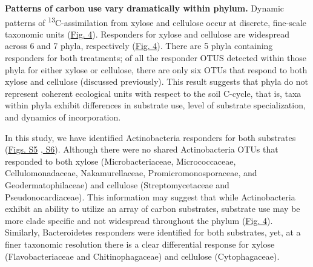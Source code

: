 \textbf{Patterns of carbon use vary dramatically within phylum.} Dynamic
patterns of \textsuperscript{13}C-assimilation from xylose and cellulose occur
at discrete, fine-scale taxonomic units
(\href{https://authorea.com/users/3537/articles/3612/master/file/figures/bacteria_tree/bacteria_tree.png}{Fig.
4}). Responders for xylose and cellulose are widespread across 6 and 7 phyla,
respectively
(\href{https://authorea.com/users/3537/articles/3612/master/file/figures/bacteria_tree/bacteria_tree.png}{Fig.
4}). There are 5 phyla containing responders for both treatments; of all the
responder OTUS detected within those phyla for either xylose or cellulose,
there are only six OTUs that respond to both xylose and cellulose (discussed
previously). This result suggests that phyla do not represent coherent
ecological units with respect to the soil C-cycle, that is, taxa within phyla
exhibit differences in substrate use, level of substrate specialization, and
dynamics of incorporation. 

In this study, we have identified Actinobacteria responders for both substrates
(\href{https://authorea.com/users/3537/articles/8459/master/file/figures/xylose_resp_profiles/xylose_resp_profiles.png}{Figs.
S5}
\href{https://authorea.com/users/3537/articles/8459/master/file/figures/cellulose_resp_profiles/cellulose_resp_profiles.png}{,
S6}). Although there were no shared Actinobacteria OTUs that responded to both
xylose (Microbacteriaceae, Micrococcaceae, Cellulomonadaceae, Nakamurellaceae,
Promicromonosporaceae, and Geodermatophilaceae) and cellulose
(Streptomycetaceae and Pseudonocardiaceae). This information may suggest that
while Actinobacteria exhibit an ability to utilize an array of carbon
substrates, substrate use may be more clade specific and not widespread
throughout the phylum
(\href{https://authorea.com/users/3537/articles/3612/master/file/figures/bacteria_tree/bacteria_tree.png}{Fig.
4}). Similarly, Bacteroidetes responders were identified for both substrates,
yet, at a finer taxonomic resolution there is a clear differential response for
xylose (Flavobacteriaceae and Chitinophagaceae) and cellulose (Cytophagaceae). 


